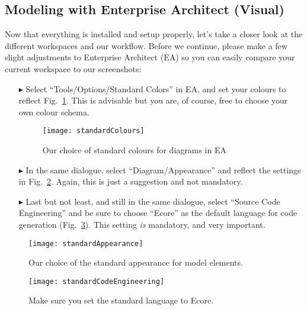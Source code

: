 \visHeader

\subsection{Modeling with Enterprise Architect (Visual)}

Now\hypertarget{projectStructure vis}{} that everything is installed and setup properly, let's take a closer look at the different workspaces and our workflow.
Before we continue, please make a few slight adjustments to Enterprise Architect (EA) so you can easily compare your current workspace to our screenshots:
\begin{itemize}

\item[$\blacktriangleright$] Select ``Tools/Options/Standard Colors'' in EA, and set your colours to reflect Fig.~\ref{fig_standardColoursEA}.
This is advisable but you are, of course, free to choose your own colour schema.

\begin{figure}[htbp]
  \centering
  \texttt{[image: standardColours]}
  \caption{Our choice of standard colours for diagrams in EA}
  \label{fig_standardColoursEA}
\end{figure}

\item[$\blacktriangleright$] In the same dialogue, select ``Diagram/Appearance'' and reflect the settings in Fig.~\ref{fig_standardAppearanceEA}.
Again, this is just a suggestion and not mandatory.

\item[$\blacktriangleright$] Last but not least, and still in the same dialogue, select ``Source Code Engineering'' and be sure to choose ``Ecore'' as the default language for code generation (Fig.~\ref{fig_standardSCEEA}). This setting \emph{is} mandatory, and very important.
\end{itemize}

\begin{figure}[htbp]
  \centering
  \texttt{[image: standardAppearance]}
  \caption{Our choice of the standard appearance for model elements.}
  \label{fig_standardAppearanceEA}
\end{figure}

\begin{figure}[htbp]
    \centering
    \texttt{[image: standardCodeEngineering]}
    \caption{Make sure you set the standard language to Ecore.}
    \label{fig_standardSCEEA}
 \end{figure}
 
